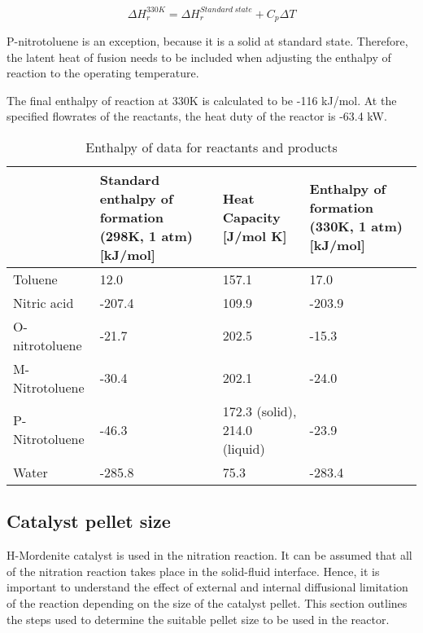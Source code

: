 \begin{equation}
  \Delta H_{r}^{330K} = \Delta H_{r}^{Standard \ state} + C_p \Delta T
\end{equation}

P-nitrotoluene is an exception, because it is a solid at standard state. Therefore, the latent heat of fusion needs to be included when adjusting the enthalpy of reaction to the operating temperature. 

The final enthalpy of reaction at 330K is calculated to be -116 kJ/mol. At the specified flowrates of the reactants, the heat duty of the reactor is -63.4 kW.

\begin{table}[H]
\centering
\caption{Enthalpy of data for reactants and products}
\label{tab:Heat enthalpy table}
\begin{tabularx}{\linewidth}{l|XXX}
\toprule
                                                                & Standard enthalpy of formation (298K, 1 atm) [kJ/mol] & Heat Capacity [J/mol K] & Enthalpy of formation (330K, 1 atm) [kJ/mol] \\ \midrule
Toluene                        & 12.0              & 157.1              & 17.0                     \\
Nitric acid                      & -207.4              & 109.9              & -203.9                       \\
O-nitrotoluene & -21.7             & 202.5              & -15.3              \\ 
M-Nitrotoluene                      & -30.4              & 202.1             & -24.0                       \\
P-Nitrotoluene                      & -46.3              & 172.3 (solid), 214.0 (liquid)             & -23.9                        \\
Water                     & -285.8              & 75.3              & -283.4                        \\
\bottomrule
\end{tabularx}
\end{table}
\subsection{Catalyst pellet size}
H-Mordenite catalyst is used in the nitration reaction. 
It can be assumed that all of the nitration reaction takes place in the solid-fluid interface. Hence, it is important to understand the effect of external and internal diffusional limitation of the reaction depending on the size of the catalyst pellet. This section outlines the steps used to determine the suitable pellet size to be used in the reactor.

